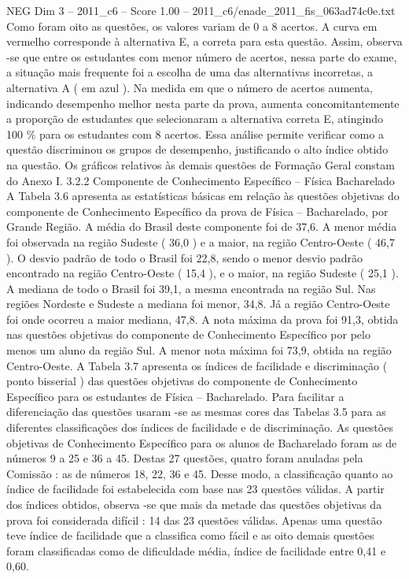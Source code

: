 \begin{textsample}{NEG Dim 3 – 2011\_c6 – Score 1.00 – 2011\_c6/enade\_2011\_fis\_063ad74c0e.txt}
Como foram oito as questões, os valores variam de 0 a 8 acertos.
A curva em vermelho corresponde à alternativa E, a correta para esta questão.
Assim, observa -se que entre os estudantes com menor número de acertos, nessa parte do exame, a situação mais frequente foi a escolha de uma das alternativas incorretas, a alternativa A ( em azul ).
Na medida em que o número de acertos aumenta, indicando desempenho melhor nesta parte da prova, aumenta concomitantemente a proporção de estudantes que selecionaram a alternativa correta E, atingindo 100 \% para os estudantes com 8 acertos.
Essa análise permite verificar como a questão discriminou os grupos de desempenho, justificando o alto índice obtido na questão.
Os gráficos relativos às demais questões de Formação Geral constam do Anexo I. 3.2.2 Componente de Conhecimento Específico – Física Bacharelado A Tabela 3.6 apresenta as estatísticas básicas em relação às questões objetivas do componente de Conhecimento Específico da prova de Física – Bacharelado, por Grande Região.
A média do Brasil deste componente foi de 37,6.
A menor média foi observada na região Sudeste ( 36,0 ) e a maior, na região Centro-Oeste ( 46,7 ).
O desvio padrão de todo o Brasil foi 22,8, sendo o menor desvio padrão encontrado na região Centro-Oeste ( 15,4 ), e o maior, na região Sudeste ( 25,1 ).
A mediana de todo o Brasil foi 39,1, a mesma encontrada na região Sul.
Nas regiões Nordeste e Sudeste a mediana foi menor, 34,8.
Já a região Centro-Oeste foi onde ocorreu a maior mediana, 47,8.
A nota máxima da prova foi 91,3, obtida nas questões objetivas do componente de Conhecimento Específico por pelo menos um aluno da região Sul.
A menor nota máxima foi 73,9, obtida na região Centro-Oeste.
A Tabela 3.7 apresenta os índices de facilidade e discriminação ( ponto bisserial ) das questões objetivas do componente de Conhecimento Específico para os estudantes de Física – Bacharelado.
Para facilitar a diferenciação das questões usaram -se as mesmas cores das Tabelas 3.5 para as diferentes classificações dos índices de facilidade e de discriminação.
As questões objetivas de Conhecimento Específico para os alunos de Bacharelado foram as de números 9 a 25 e 36 a 45.
Destas 27 questões, quatro foram anuladas pela Comissão : as de números 18, 22, 36 e 45.
Desse modo, a classificação quanto ao índice de facilidade foi estabelecida com base nas 23 questões válidas.
A partir dos índices obtidos, observa -se que mais da metade das questões objetivas da prova foi considerada difícil : 14 das 23 questões válidas.
Apenas uma questão teve índice de facilidade que a classifica como fácil e as oito demais questões foram classificadas como de dificuldade média, índice de facilidade entre 0,41 e 0,60.

\end{textsample}
